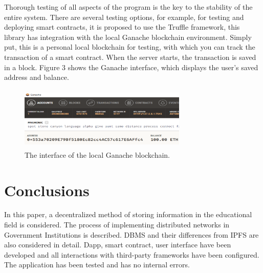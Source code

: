 \documentclass[10pt,conference,a4paper]{IEEEtran_EDM}
\begin{document}
Thorough testing of all aspects of the program is the key to the stability of the entire system. There are several testing options, for example, for testing and deploying smart contracts, it is proposed to use the Truffle framework, this library has integration with the local Ganache blockchain environment. Simply put, this is a personal local blockchain for testing, with which you can track the transaction of a smart contract. When the server starts, the transaction is saved in a block. Figure 3 shows the Ganache interface, which displays the user's saved address and balance.

\begin{figure}[htbp]
\includegraphics[width=8cm, height=3cm]{fig3.png}
\caption{The interface of the local Ganache blockchain.}
\label{fig}
\end{figure}

\section{Conclusions }
In this paper, a decentralized method of storing information in the educational field is considered. The process of implementing distributed networks in Government Institutions is described. DBMS and their differences from IPFS are also considered in detail. Dapp, smart contract, user interface have been developed and all interactions with third-party frameworks have been configured. The application has been tested and has no internal errors.
\end{document}
